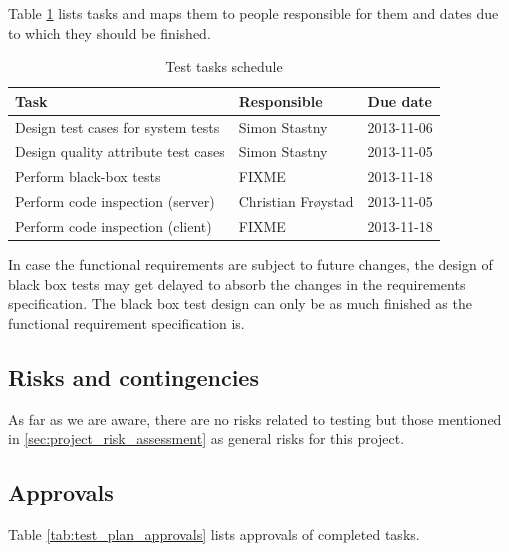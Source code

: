 \documentclass[11pt]{book}
\begin{document}
Table \ref{tab:test_plan_schedule} lists tasks and maps them to people responsible for them and dates due to which they should be finished. 

\begin{table}[H]
    \centering
    \begin{tabular}{| l | l | l |}
        \hline
        Task                                & Responsible             & Due date       \\ \hline
        Design test cases for system tests  & Simon Stastny           & 2013-11-06     \\ \hline
        Design quality attribute test cases & Simon Stastny           & 2013-11-05     \\ \hline
        Perform black-box tests             & FIXME                   & 2013-11-18     \\ \hline
        Perform code inspection (server)    & Christian Frøystad      & 2013-11-05     \\ \hline
        Perform code inspection (client)    & FIXME                   & 2013-11-18     \\ \hline
    \end{tabular}
    \caption{Test tasks schedule}
    \label{tab:test_plan_schedule}
\end{table}

In case the functional requirements are subject to future changes, the design of black box tests may get delayed to absorb the changes in the requirements specification. The black box test design can only be as much finished as the functional requirement specification is.

\subsection{Risks and contingencies}
As far as we are aware, there are no risks related to testing but those mentioned in \ref{sec:project_risk_assessment} as general risks for this project.

\subsection{Approvals}

Table \ref{tab:test_plan_approvals} lists approvals of completed tasks.
\end{document}
